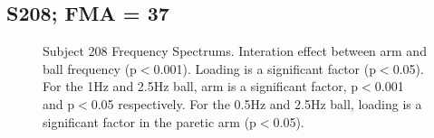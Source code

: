 \documentclass{article}
\begin{document}
\clearpage
\subsection{S208; FMA = 37}

\begin{figure}[!ht]
     \centering
     \hfill
     \hfill
	\caption{Subject 208 Frequency Spectrums. Interation effect between arm and ball frequency (p$<$0.001). Loading is a significant factor (p$<$0.05). For the 1Hz and 2.5Hz ball, arm is a significant factor, p$<$0.001 and p$<$0.05 respectively. For the 0.5Hz and 2.5Hz ball, loading is a significant factor in the paretic arm (p$<$0.05).}
\end{figure}
\end{document}
